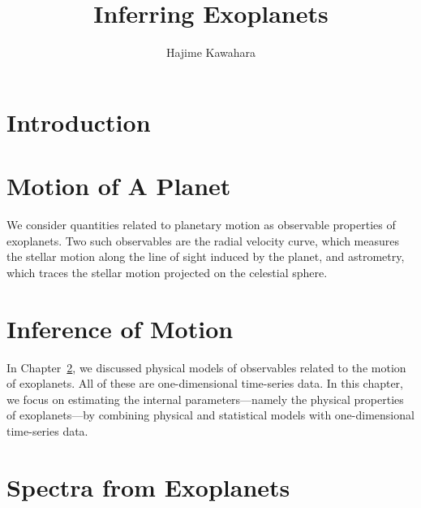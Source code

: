 \documentclass[a4paper,twocolumn]{report}
\begin{document}
\title{Inferring Exoplanets}
\author{Hajime Kawahara}
\maketitle

\tableofcontents

\chapter{Introduction}




\chapter{Motion of A Planet}\label{ch:motion}
We consider quantities related to planetary motion as observable properties of exoplanets. Two such observables are the radial velocity curve, which measures the stellar motion along the line of sight induced by the planet, and astrometry, which traces the stellar motion projected on the celestial sphere.




\chapter{Inference of Motion}\label{ch:infer}

In Chapter~\ref{ch:motion}, we discussed physical models of observables related to the motion of exoplanets. All of these are one-dimensional time-series data. In this chapter, we focus on estimating the internal parameters—namely the physical properties of exoplanets—by combining physical and statistical models with one-dimensional time-series data.






\chapter{Spectra from Exoplanets}
\end{document}
